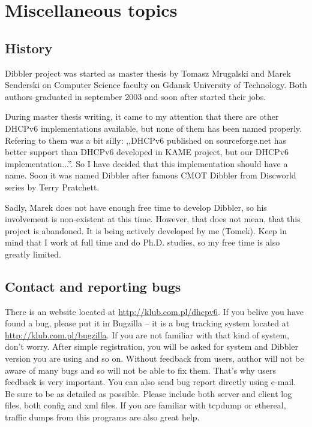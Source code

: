 
\newpage
\section{Miscellaneous topics}

\subsection{History}
Dibbler project was started as master thesis by Tomasz Mrugalski and
Marek Senderski on Computer Science faculty on Gdansk University of
Technology. Both authors graduated in september 2003 and soon after
started their jobs.

During master thesis writing, it came to my attention that there are
other DHCPv6 implementations available, but none of them has been
named properly. Refering to them was a bit
silly: ,,DHCPv6 published on sourceforge.net has better support than
DHCPv6 developed in KAME project, but our DHCPv6
implementation...''. So I have decided that this implementation should
have a name. Soon it was named Dibbler after famous CMOT
Dibbler from Discworld series by Terry Pratchett.

Sadly, Marek does not have enough free time to develop Dibbler, so his
involvement is non-existent at this time. However, that does not mean,
that this project is abandoned. It is being actively developed by
me (Tomek). Keep in mind that I work at full time and do
Ph.D. studies, so my free time is also greatly limited.

\hypertarget{contact}{}
\subsection{Contact and reporting bugs}
\label{contact}
There is an website located at \url{http://klub.com.pl/dhcpv6}. If
you belive you have found a bug, please put it in Bugzilla -- it is a
bug tracking system located at \url{http://klub.com.pl/bugzilla}. If
you are not familiar with that kind of system, don't worry. After
simple registration, you will be asked for system and Dibbler version
you are using and so on. Without feedback from users, author will not
be aware of many bugs and so will not be able to fix them. That's why
users feedback is very important. You can also send bug report
directly using e-mail. Be sure to be as detailed as possible. Please
include both server and client log files, both config and xml
files. If you are familiar with tcpdump or ethereal, traffic dumps
from this programs are also great help.

